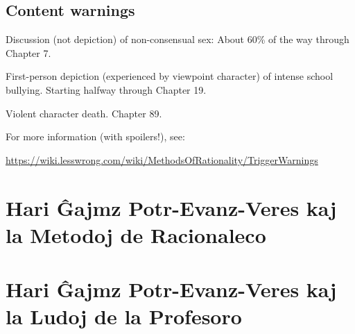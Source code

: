 \RequirePackage[pdf]{layout/hp-book}


{
\pagestyle{empty}



\chapter*{Content warnings}
\thispagestyle{empty}

Discussion (not depiction) of non-consensual sex: About 60\% of the way through Chapter 7.

First-person depiction (experienced by viewpoint character) of intense school bullying. Starting halfway through Chapter 19.

Violent character death. Chapter 89.

For more information (with spoilers!), see:
\begin{center}\url{https://wiki.lesswrong.com/wiki/MethodsOfRationality/TriggerWarnings}\end{center}


\cleartorecto
}
\setcounter{page}{1}


\part{Hari Ĝajmz Potr-Evanz-Veres kaj la Metodoj de Racionaleco}
% 
% 
% 
% 
% 
% 
% 
% 
% 
% 
% 
% 
% 
% 
% 
% 
% 
% 
% 
% 
\part{Hari Ĝajmz Potr-Evanz-Veres kaj la Ludoj de la Profesoro}
% 
% 
% 
% 
% 
% 
% 
% 
% 
% 
% 
% 
% 
% 
% 
% 
